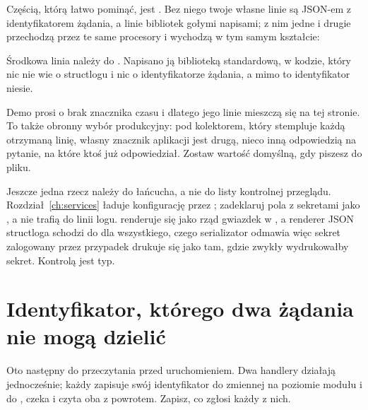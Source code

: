 

\noindent
Częścią, którą łatwo pominąć, jest . Bez niego
twoje własne linie są JSON-em z identyfikatorem żądania, a linie bibliotek
gołymi napisami; z nim jedne i drugie przechodzą przez te same procesory i
wychodzą w tym samym kształcie:


\noindent
Środkowa linia należy do . Napisano ją biblioteką standardową, w
kodzie, który nic nie wie o structlogu i nic o identyfikatorze żądania, a
mimo to identyfikator niesie.

\begin{note}
Demo prosi o brak znacznika czasu i dlatego jego linie mieszczą się na tej
stronie. To także obronny wybór produkcyjny: pod kolektorem, który stempluje
każdą otrzymaną linię, własny znacznik aplikacji jest drugą, nieco inną
odpowiedzią na pytanie, na które ktoś już odpowiedział. Zostaw wartość
domyślną, gdy piszesz do pliku.
\end{note}

\noindent
Jeszcze jedna rzecz należy do łańcucha, a nie do listy kontrolnej przeglądu.
Rozdział~\ref{ch:services} ładuje konfigurację przez ;
zadeklaruj pola z sekretami jako , a nie trafią do linii
logu.  renderuje się jako rząd gwiazdek w , a
renderer JSON structloga schodzi do  dla wszystkiego, czego
serializator odmawia \dash{} więc sekret zalogowany przez przypadek drukuje
się jako  tam, gdzie zwykły 
wydrukowałby sekret. Kontrolą jest typ.

\section{Identyfikator, którego dwa żądania nie mogą dzielić}
\label{sec:ch12-contextvars}

Oto następny do przeczytania przed uruchomieniem. Dwa handlery działają
jednocześnie; każdy zapisuje swój identyfikator do zmiennej na poziomie
modułu i do , czeka i czyta oba z powrotem. Zapisz, co
zgłosi każdy z nich.

